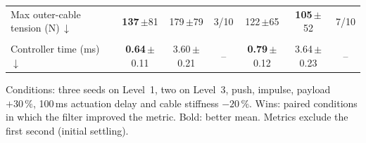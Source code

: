 \begin{table}[t]
\begin{tabular}{@{}lcccccc@{}}
\quad Max outer-cable tension (N)\,$\downarrow$ & \textbf{137}\,{\scriptsize$\pm$81} & 179\,{\scriptsize$\pm$79} & 3/10 & 122\,{\scriptsize$\pm$65} & \textbf{105}\,{\scriptsize$\pm$52} & 7/10 \\
\addlinespace[2pt]
\multicolumn{7}{@{}l}{\textit{Cost}} \\
\quad Controller time (ms)\,$\downarrow$ & \textbf{0.64}\,{\scriptsize$\pm$0.11} & 3.60\,{\scriptsize$\pm$0.21} & -- & \textbf{0.79}\,{\scriptsize$\pm$0.12} & 3.64\,{\scriptsize$\pm$0.23} & -- \\
\bottomrule
\end{tabular}
\par\vspace{3pt}\parbox{\textwidth}{\scriptsize\raggedright Conditions: three seeds on Level~1, two on Level~3, push, impulse, payload $+30\,\%$, 100\,ms actuation delay and cable stiffness $-20\,\%$. Wins: paired conditions in which the filter improved the metric. Bold: better mean. Metrics exclude the first second (initial settling).}
\end{table}
